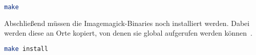 \begin{lstlisting}[language=Bash, caption=Imagemagick Installation: make Befehl,label={lst:installmake}]
make
\end{lstlisting}
\vspace{5mm}

Abschließend müssen die Imagemagick-Binaries noch installiert werden.
Dabei werden diese an Orte kopiert, von denen sie global aufgerufen werden können~\cite{HowInstallImageMagick}.

\begin{lstlisting}[language=Bash, caption=Imagmagick Installation: make install Befehl,label={lst:installmakeinstall}]
make install
\end{lstlisting}
\vspace{5mm}